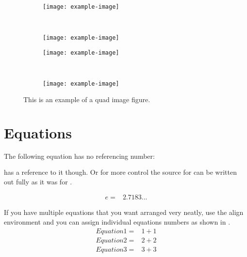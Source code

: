   \begin{figure}[!htb]
    \centering
    \begin{subfigure}{0.45\textwidth}
      \texttt{[image: example-image]}
      \caption{} %
      \label{fig:quadImage:a}
    \end{subfigure}
    ~ %
    \begin{subfigure}{0.45\textwidth}
      \texttt{[image: example-image]}
      \caption{} %
      \label{fig:quadImage:b}
    \end{subfigure}
    \par\vspace{1em} %
    \begin{subfigure}{0.45\textwidth}
      \texttt{[image: example-image]}
      \caption{} %
      \label{fig:quadImage:c}
    \end{subfigure}
    ~ %
    \begin{subfigure}{0.45\textwidth}
      \texttt{[image: example-image]}
      \caption{} %
      \label{fig:quadImage:d}
    \end{subfigure}
    \caption{This is an example of a quad image figure.}
    \label{fig:quadImage}
  \end{figure}
  
  \clearpage %
  \section{Equations}
  The following equation has no referencing number:
  
   has a reference to it though. Or for more control the source for  can be written out fully as it was for .
  
  \begin{align}\label{eq:quickEq2}
    e = & 2.7183...
  \end{align}
  
  If you have multiple equations that you want arranged very neatly, use the align environment and you can assign individual equations numbers as shown in .
  \begin{align}%
    \label{eq:multiref:a} Equation1 = & 1 + 1\\
    \label{eq:multiref:b} Equation2 = & 2 + 2\\
    \label{eq:multiref:c} Equation3 = & 3 + 3
  \end{align}
  
  
  
  \printreferences %